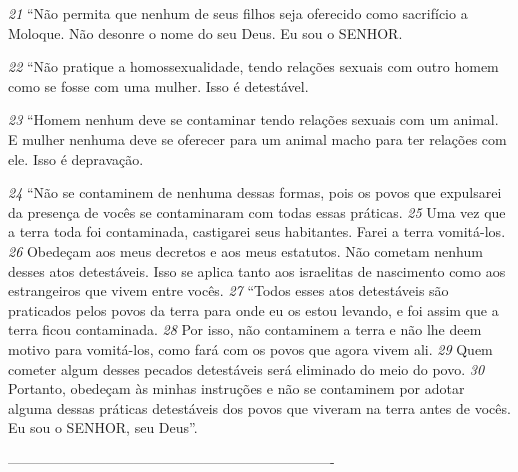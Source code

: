 \smallskip
\textit{\tiny 21}
“Não permita que nenhum de seus filhos seja oferecido como sacrifício a
Moloque. Não desonre o nome do seu Deus. Eu sou o SENHOR.
   
\smallskip
\textit{\tiny 22}
“Não pratique a homossexualidade, tendo relações sexuais com outro
homem como se fosse com uma mulher. Isso é detestável.
   
\smallskip
\textit{\tiny 23}
“Homem nenhum deve se contaminar tendo relações sexuais com um
animal. E mulher nenhuma deve se oferecer para um animal macho para ter
relações com ele. Isso é depravação.
   
\smallskip
\textit{\tiny 24}
“Não se contaminem de nenhuma dessas formas, pois os povos que
expulsarei da presença de vocês se contaminaram com todas essas práticas.
\textit{\tiny 25}
Uma vez que a terra toda foi contaminada, castigarei seus habitantes. Farei a
terra vomitá-los. 
\textit{\tiny 26}
Obedeçam aos meus decretos e aos meus estatutos. Não
cometam nenhum desses atos detestáveis. Isso se aplica tanto aos israelitas de
nascimento como aos estrangeiros que vivem entre vocês.
\textit{\tiny 27}
“Todos esses atos detestáveis são praticados pelos povos da terra para onde
eu os estou levando, e foi assim que a terra ficou contaminada. 
\textit{\tiny 28}
Por isso, não
contaminem a terra e não lhe deem motivo para vomitá-los, como fará com os
povos que agora vivem ali. 
\textit{\tiny 29}
Quem cometer algum desses pecados detestáveis
será eliminado do meio do povo. 
\textit{\tiny 30}
Portanto, obedeçam às minhas instruções e
não se contaminem por adotar alguma dessas práticas detestáveis dos povos que
viveram na terra antes de vocês. Eu sou o SENHOR, seu Deus”.

----------------------------------------------------------------------
